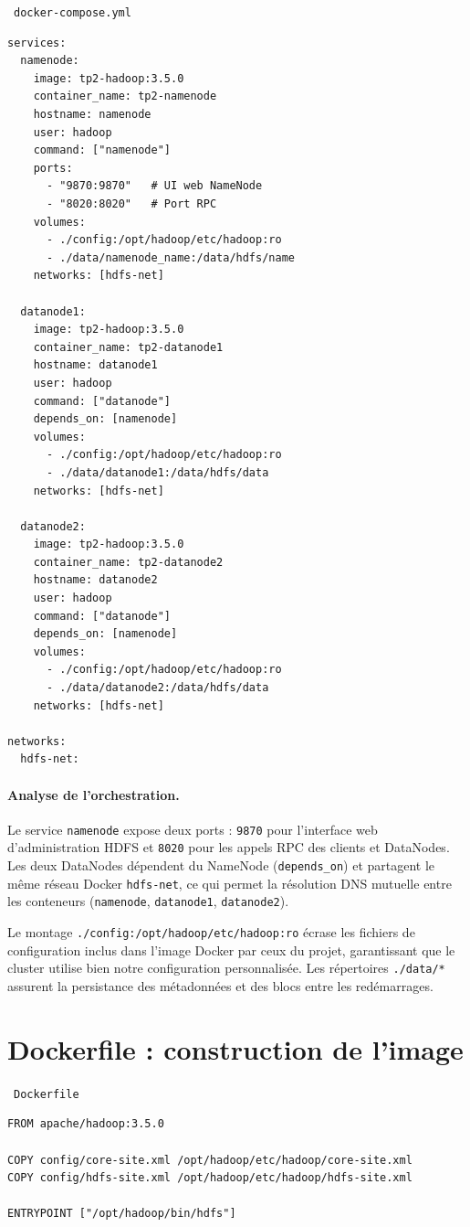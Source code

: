 \documentclass[11pt,a4paper]{article}
\newcommand{\fichier}[1]{%
  \par\medskip\noindent
  {\sffamily\small\bfseries\color{ENIADNavy}%
   \colorbox{ENIADLightBlue}{\strut\ \texttt{#1}\ }}%
  \par\nopagebreak\vspace{-2pt}}
\begin{document}
\fichier{docker-compose.yml}
\begin{lstlisting}
services:
  namenode:
    image: tp2-hadoop:3.5.0
    container_name: tp2-namenode
    hostname: namenode
    user: hadoop
    command: ["namenode"]
    ports:
      - "9870:9870"   # UI web NameNode
      - "8020:8020"   # Port RPC
    volumes:
      - ./config:/opt/hadoop/etc/hadoop:ro
      - ./data/namenode_name:/data/hdfs/name
    networks: [hdfs-net]

  datanode1:
    image: tp2-hadoop:3.5.0
    container_name: tp2-datanode1
    hostname: datanode1
    user: hadoop
    command: ["datanode"]
    depends_on: [namenode]
    volumes:
      - ./config:/opt/hadoop/etc/hadoop:ro
      - ./data/datanode1:/data/hdfs/data
    networks: [hdfs-net]

  datanode2:
    image: tp2-hadoop:3.5.0
    container_name: tp2-datanode2
    hostname: datanode2
    user: hadoop
    command: ["datanode"]
    depends_on: [namenode]
    volumes:
      - ./config:/opt/hadoop/etc/hadoop:ro
      - ./data/datanode2:/data/hdfs/data
    networks: [hdfs-net]

networks:
  hdfs-net:
\end{lstlisting}

\paragraph{Analyse de l'orchestration.}
Le service \texttt{namenode} expose deux ports : \texttt{9870} pour l'interface web d'administration HDFS et \texttt{8020} pour les appels RPC des clients et DataNodes. Les deux DataNodes dépendent du NameNode (\texttt{depends\_on}) et partagent le même réseau Docker \texttt{hdfs-net}, ce qui permet la résolution DNS mutuelle entre les conteneurs (\texttt{namenode}, \texttt{datanode1}, \texttt{datanode2}).

Le montage \texttt{./config:/opt/hadoop/etc/hadoop:ro} écrase les fichiers de configuration inclus dans l'image Docker par ceux du projet, garantissant que le cluster utilise bien notre configuration personnalisée. Les répertoires \texttt{./data/*} assurent la persistance des métadonnées et des blocs entre les redémarrages.


\section{Dockerfile : construction de l'image}

\fichier{Dockerfile}
\begin{lstlisting}
FROM apache/hadoop:3.5.0

COPY config/core-site.xml /opt/hadoop/etc/hadoop/core-site.xml
COPY config/hdfs-site.xml /opt/hadoop/etc/hadoop/hdfs-site.xml

ENTRYPOINT ["/opt/hadoop/bin/hdfs"]
\end{lstlisting}
\end{document}
